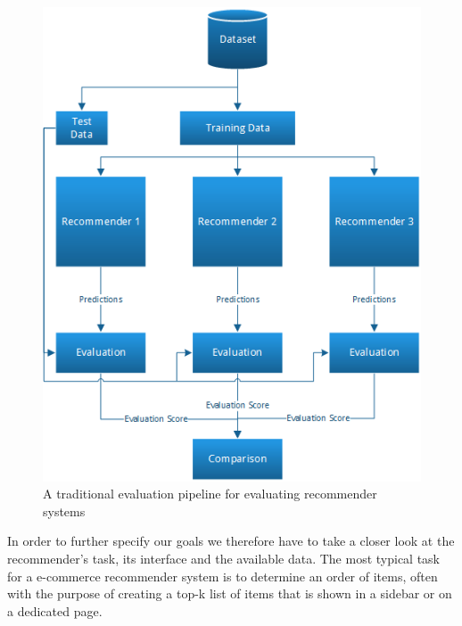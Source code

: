 \begin{figure}[H]
		\centering
	  	\includegraphics[height=0.65\linewidth]{image/evaluationpipeline.png}
		\caption[A Traditional Evaluation Pipeline]{A traditional evaluation pipeline for evaluating recommender systems}
		\label{figure:evaluationpipeline}
\end{figure}

In order to further specify our goals we therefore have to take a closer look at the recommender's task,
its interface and the available data. The most typical task for a e-commerce recommender system is to determine an order of items, often with the purpose of creating a top-k list of items that is shown in a sidebar or on a
dedicated page.

